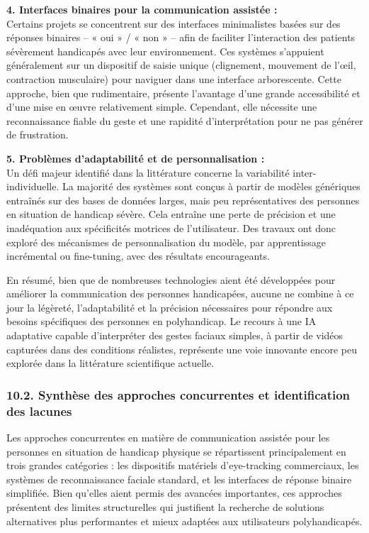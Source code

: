 \documentclass[
]{article}
\begin{document}
\textbf{4. Interfaces binaires pour la communication assistée :\\
} Certains projets se concentrent sur des interfaces minimalistes basées sur des réponses binaires -- « oui » / « non » -- afin de faciliter l'interaction des patients sévèrement handicapés avec leur environnement. Ces systèmes s'appuient généralement sur un dispositif de saisie unique (clignement, mouvement de l'œil, contraction musculaire) pour naviguer dans une interface arborescente. Cette approche, bien que rudimentaire, présente l'avantage d'une grande accessibilité et d'une mise en œuvre relativement simple. Cependant, elle nécessite une reconnaissance fiable du geste et une rapidité d'interprétation pour ne pas générer de frustration.

\textbf{5. Problèmes d'adaptabilité et de personnalisation :\\
} Un défi majeur identifié dans la littérature concerne la variabilité inter-individuelle. La majorité des systèmes sont conçus à partir de modèles génériques entraînés sur des bases de données larges, mais peu représentatives des personnes en situation de handicap sévère. Cela entraîne une perte de précision et une inadéquation aux spécificités motrices de l'utilisateur. Des travaux ont donc exploré des mécanismes de personnalisation du modèle, par apprentissage incrémental ou fine-tuning, avec des résultats encourageants.

En résumé, bien que de nombreuses technologies aient été développées pour améliorer la communication des personnes handicapées, aucune ne combine à ce jour la légèreté, l'adaptabilité et la précision nécessaires pour répondre aux besoins spécifiques des personnes en polyhandicap. Le recours à une IA adaptative capable d'interpréter des gestes faciaux simples, à partir de vidéos capturées dans des conditions réalistes, représente une voie innovante encore peu explorée dans la littérature scientifique actuelle.

\hypertarget{synthuxe8se-des-approches-concurrentes-et-identification-des-lacunes}{%
\subsubsection{\texorpdfstring{10.2. Synthèse des approches concurrentes et identification des lacunes{}}{10.2. Synthèse des approches concurrentes et identification des lacunes}}\label{synthuxe8se-des-approches-concurrentes-et-identification-des-lacunes}}

Les approches concurrentes en matière de communication assistée pour les personnes en situation de handicap physique se répartissent principalement en trois grandes catégories : les dispositifs matériels d'eye-tracking commerciaux, les systèmes de reconnaissance faciale standard, et les interfaces de réponse binaire simplifiée. Bien qu'elles aient permis des avancées importantes, ces approches présentent des limites structurelles qui justifient la recherche de solutions alternatives plus performantes et mieux adaptées aux utilisateurs polyhandicapés.
\end{document}
